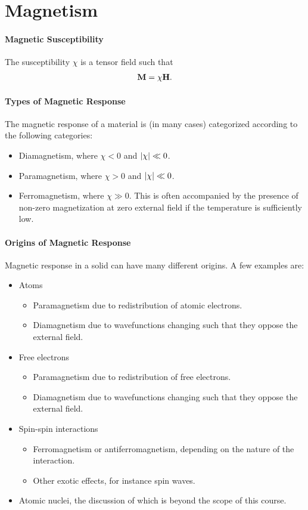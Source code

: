 \section{Magnetism}

\paragraph{Magnetic Susceptibility}
The susceptibility $\chi$ is a tensor field such that
\begin{align*}
	\vb{M} = \chi\vb{H}.
\end{align*}

\paragraph{Types of Magnetic Response}
The magnetic response of a material is (in many cases) categorized according to the following categories:
\begin{itemize}
	\item Diamagnetism, where $\chi < 0$ and $\abs{\chi} \ll 0$.
	\item Paramagnetism, where $\chi > 0$ and $\abs{\chi} \ll 0$.
	\item Ferromagnetism, where $\chi \gg 0$. This is often accompanied by the presence of non-zero magnetization at zero external field if the temperature is sufficiently low.
\end{itemize}

\paragraph{Origins of Magnetic Response}
Magnetic response in a solid can have many different origins. A few examples are:
\begin{itemize}
	\item Atoms
	\begin{itemize}
		\item Paramagnetism due to redistribution of atomic electrons.
		\item Diamagnetism due to wavefunctions changing such that they oppose the external field.
	\end{itemize}
	\item Free electrons
	\begin{itemize}
		\item Paramagnetism due to redistribution of free electrons.
		\item Diamagnetism due to wavefunctions changing such that they oppose the external field.
	\end{itemize}
	\item Spin-spin interactions
	\begin{itemize}
		\item Ferromagnetism or antiferromagnetism, depending on the nature of the interaction.
		\item Other exotic effects, for instance spin waves.
	\end{itemize}
	\item Atomic nuclei, the discussion of which is beyond the scope of this course.
\end{itemize}

